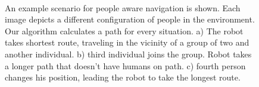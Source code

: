 \begin{figure}[hbtp]
\centering
         \\
    \caption{%
	An example scenario for people aware navigation is shown. Each image depicts a different configuration of people in the environment. Our algorithm calculates a path for every situation. a) The robot takes shortest route, traveling in the vicinity of a group of two and another individual. b) third individual joins the group. Robot takes a longer path that doesn't have humans on path. c) fourth person changes his position, leading the robot to take the longest route.
     }%
   \label{fig:sim}
\end{figure}

